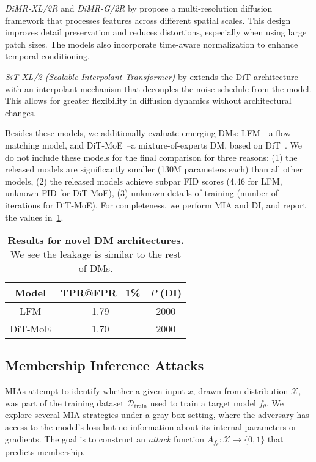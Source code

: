 {\textit{DiMR-XL/2R} and \textit{DiMR-G/2R} by \citet{liu2024alleviating} propose a multi-resolution diffusion framework that processes features across different spatial scales. This design improves detail preservation and reduces distortions, especially when using large patch sizes. The models also incorporate time-aware normalization to enhance temporal conditioning.}

{\textit{SiT-XL/2 (Scalable Interpolant Transformer)} by \citet{ma2024sit} extends the DiT architecture with an interpolant mechanism that decouples the noise schedule from the model. This allows for greater flexibility in diffusion dynamics without architectural changes.}

{Besides these models, we additionally evaluate emerging DMs: LFM~\citep{dao2023flow}--a flow-matching model, and DiT-MoE~\citep{fei2024scalingdiffusiontransformers16}--a mixture-of-experts DM, based on DiT~\citep{peebles2022dit}. We do not include these models for the final comparison for three reasons: (1) the released models are significantly smaller (130M parameters each) than all other models, (2) the released models achieve subpar FID scores (4.46 for LFM, unknown FID for DiT-MoE), (3) unknown details of training (number of iterations for DiT-MoE). For completeness, we perform MIA and DI, and report the values in~\cref{tab:extra_dms}.}

\begin{table}[!ht]
    \centering
    \scriptsize
    \caption{{\textbf{Results for novel DM architectures.} We see the leakage is similar to the rest of DMs.}}
    \begin{tabular}{ccc}
        \toprule
        Model & TPR@FPR=1\% & $P$ (DI) \\
        \midrule
        LFM & 1.79 & 2000\\
        DiT-MoE & 1.70 & 2000 \\
        \bottomrule
    \end{tabular}
    \label{tab:extra_dms}
\end{table}

\subsection{Membership Inference Attacks}
\label{app:mias_full}


MIAs attempt to identify whether a given input $x$, drawn from distribution $\mathcal{X}$, was part of the training dataset $\mathcal{D}_{\text{train}}$ used to train a target model $f_\theta$. We explore several MIA strategies under a gray-box setting, where the adversary has access to the model’s loss but no information about its internal parameters or gradients. The goal is to construct an \textit{attack} function $A_{f_\theta}: \mathcal{X} \rightarrow \{0, 1\}$ that predicts membership. 

